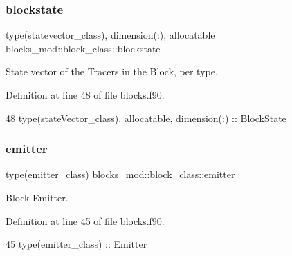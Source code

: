 \subsubsection{\texorpdfstring{blockstate}{blockstate}}
{\footnotesize\ttfamily type(statevector\+\_\+class), dimension(\+:), allocatable blocks\+\_\+mod\+::block\+\_\+class\+::blockstate\hspace{0.3cm}{\ttfamily [private]}}



State vector of the Tracers in the Block, per type. 



Definition at line 48 of file blocks.\+f90.


\begin{DoxyCode}
48         \textcolor{keywordtype}{type}(stateVector\_class), \textcolor{keywordtype}{allocatable}, \textcolor{keywordtype}{dimension(:)} :: BlockState
\end{DoxyCode}
\mbox{\label{structblocks__mod_1_1block__class_a55e85183ba871abcaba1c00d5393611f}} 
\subsubsection{\texorpdfstring{emitter}{emitter}}
{\footnotesize\ttfamily type(\mbox{\hyperlink{structemitter__mod_1_1emitter__class}{emitter\+\_\+class}}) blocks\+\_\+mod\+::block\+\_\+class\+::emitter\hspace{0.3cm}{\ttfamily [private]}}



Block Emitter. 



Definition at line 45 of file blocks.\+f90.


\begin{DoxyCode}
45         \textcolor{keywordtype}{type}(emitter\_class)    :: Emitter
\end{DoxyCode}
\mbox{\label{structblocks__mod_1_1block__class_aff3b0cb7d8248f8a87691a028de916d3}} 

